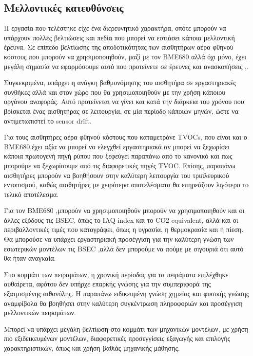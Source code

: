 \subsection{Μελλοντικές κατευθύνσεις}

Η εργασία που τελέστηκε είχε ένα διερευνητικό χαρακτήρα, οπότε μπορούν να υπάρχουν πολλές βελτιώσεις και πεδία που μπορεί να εστιάσει κάποια μελλοντική έρευνα.
Σε επίπεδο βελτίωσης της αποδοτικότητας των αισθητήρων αέρα φθηνού κόστους που μπορούν να χρησιμοποιηθούν, μαζί με τον BME680 αλλά όχι μόνο, 
έχει μεγάλη σημασία να εφαρμόσουμε αυτό που προτείνετε σε έρευνες και ανασκοπήσεις \cite{CHOJER2020138385},\cite{SA2022102551}.

Συγκεκριμένα, υπάρχει η ανάγκη βαθμονόμησης του αισθητήρα σε εργαστηριακές συνθήκες αλλά και στον χώρο που θα χρησιμοποιηθούν με την χρήση κάποιου οργάνου αναφοράς.
Αυτό προτείνεται να γίνει και κατά την διάρκεια του χρόνου που βρίσκεται ένας αισθητήρας σε λειτουργία, σε μία περίοδο κάποιων μηνών, ώστε να αντιμετωπιστεί το sensor drift.

Για τους αισθητήρες αέρα φθηνού κόστους που καταμετράνε TVOCs, που είναι και ο BME680,έχει αξία να μπορεί να ελεγχθεί εργαστηριακά αν μπορεί να ξεχωρίσει κάποια πρωτογενή πηγή ρύπου που ξεφεύγει παραπάνω από το κανονικό και πως μπορούμε να ξεχωρίσουμε
από τις διαφορετικές πηγές TVOC.
Επίσης, παραπάνω αισθητήρες μπορούν να βοηθήσουν στην καλύτερη λειτουργία του τριπλευρικού εντοπισμού, καθώς αισθητήρες με χειρότερα αποτελέσματα θα επηρεάζουν λιγότερο το τελικό αποτέλεσμα.

Για τον BME680 ,μπορούν να χρησιμοποιηθούν μπορούν να χρησιμοποιηθούν και οι άλλες εξόδους τις BSEC, όπως το IAQ index και το CO2 equivalent, αλλά και οι περιβαλλοντικές τιμές που καταγράφει, όπως η υγρασία, η θερμοκρασία και η πίεση.
Θα μπορούσε να υπάρχει εργαστηριακή προσέγγιση για την καλύτερη γνώση των εσωτερικών μοντέλων τις BSEC ,αλλά δεν μπορούμε να πούμε με σιγουριά ότι αυτό θα ήταν αναγκαία.

Στο κομμάτι των πειραμάτων, η χρονική περίοδος για τα πειράματα επιλέχθηκε αυθαίρετα, αφότου δεν υπήρχε επαρκής γνώσης για την συμπεριφορά της εξατμισμένης αιθανόλης.
Η παραπάνω ειδικευμένη γνώση χημείας και φυσικής γνώσης αναμφίβολα θα βοηθήσει στην καλύτερη συγκέντρωση πληροφοριών και προσέγγιση μελλοντικών πειραμάτων.

Μπορεί να υπάρχει μεγάλη βελτίωση στο κομμάτι των μηχανικών μοντέλων, με χρήση πιο εξιδεικευμένων μοντέλων, διαφορετικές προσεγγίσεις εξαγωγής και επιλογής χαρακτηριστικών, όπως και χρήση βαθιάς μηχανικής μάθησης.
